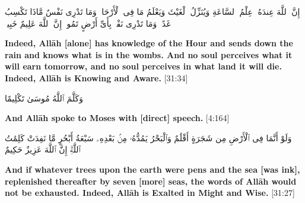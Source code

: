 \begin{center}
    \begin{RLtext}
        إِنَّ ٱللَّهَ عِندَهُۥ عِلْمُ ٱلسَّاعَةِ وَيُنَزِّلُ ٱلْغَيْثَ وَيَعْلَمُ مَا فِى ٱلْأَرْحَامِۖ وَمَا تَدْرِى نَفْسٌ مَّاذَا تَكْسِبُ غَدًاۖ وَمَا تَدْرِى نَفْسٌۢ بِأَىِّ أَرْضٍ تَمُوتُۚ إِنَّ ٱللَّهَ عَلِيمٌ خَبِيرٌۢ 
    \end{RLtext}
\end{center}
\textbf{Indeed, Allāh [alone] has knowledge of the Hour and sends down the rain and knows what is in the wombs. And no soul perceives what it will earn tomorrow, and no soul perceives in what land it will die. Indeed, Allāh is Knowing and Aware.} [31:34]

\begin{center}
    \begin{RLtext}
        وَكَلَّمَ ٱللَّهُ مُوسَىٰ تَكْلِيمًا 
    \end{RLtext}
    \textbf{And Allāh spoke to Moses with [direct] speech.} [4:164]
    \vspace{10px}
    \begin{RLtext}
        وَلَوْ أَنَّمَا فِى ٱلْأَرْضِ مِن شَجَرَةٍ أَقْلَٰمٌ وَٱلْبَحْرُ يَمُدُّهُۥ مِنۢ بَعْدِهِۦ سَبْعَةُ أَبْحُرٍ مَّا نَفِدَتْ كَلِمَٰتُ ٱللَّهِۗ إِنَّ ٱللَّهَ عَزِيزٌ حَكِيمٌ 
    \end{RLtext}
\end{center}
\textbf{And if whatever trees upon the earth were pens and the sea [was ink], replenished thereafter by seven [more] seas, the words of Allāh would not be exhausted. Indeed, Allāh is Exalted in Might and Wise.} [31:27]

